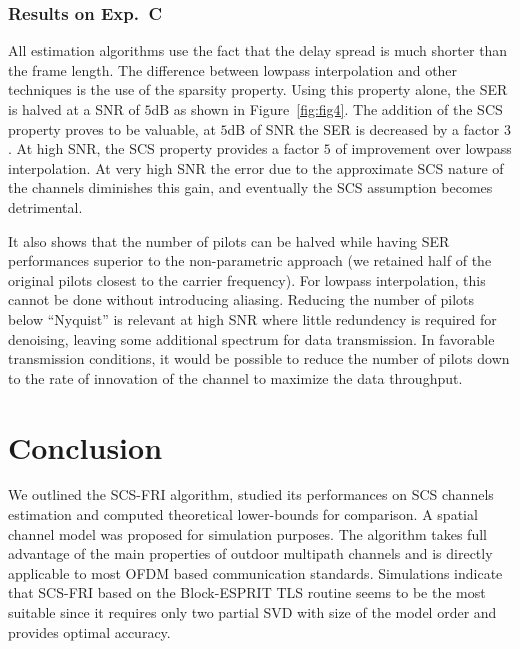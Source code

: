 \documentclass[journal,10pt]{IEEEtran}
\providecommand{\xp}[1]{\textsf{Exp.~{#1}}\ }
\begin{document}
\subsubsection{Results on \xp C}
All estimation algorithms use the fact that the delay spread is much shorter than the frame length. The difference between lowpass interpolation and other techniques is the use of the sparsity property. Using this property alone, the SER is halved at a SNR of $5$dB as shown in Figure~\ref{fig:fig4}. The addition of the SCS property proves to be valuable, at $5$dB of SNR the SER is decreased by a factor $3$. At high SNR, the SCS property provides a factor $5$ of improvement over lowpass interpolation. At very high SNR the error due to the approximate SCS nature of the channels diminishes this gain, and eventually the SCS assumption becomes detrimental.

It also shows that the number of pilots can be halved while having SER performances superior to the non-parametric approach (we retained half of the original pilots closest to the carrier frequency). For lowpass interpolation, this cannot be done without introducing aliasing. Reducing the number of pilots below ``Nyquist'' is relevant at high SNR where little redundency is required for denoising, leaving some additional spectrum for data transmission. In favorable transmission conditions, it would be possible to reduce the number of pilots down to the rate of innovation of the channel to maximize the data throughput.



 
















\section{Conclusion}
We outlined the SCS-FRI algorithm, studied its performances on SCS channels estimation and computed theoretical lower-bounds for comparison. A spatial channel model was proposed for simulation purposes. The algorithm takes full advantage of the main properties of outdoor multipath channels and is directly applicable to most OFDM based communication standards. Simulations indicate that SCS-FRI based on the Block-ESPRIT TLS routine seems to be the most suitable since it requires only two partial SVD with size of the model order and provides optimal accuracy.
\end{document}
